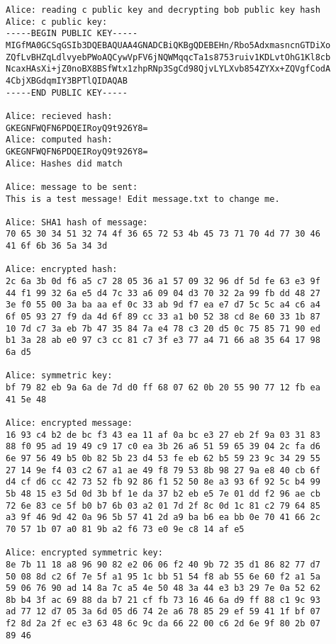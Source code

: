 \documentclass[letterpaper,12pt]{article} \usepackage{fullpage}
\begin{document}
\begin{itemize}
{\begin{verbatim}
Alice: reading c public key and decrypting bob public key hash
Alice: c public key: 
-----BEGIN PUBLIC KEY-----
MIGfMA0GCSqGSIb3DQEBAQUAA4GNADCBiQKBgQDEBEHn/Rbo5AdxmasncnGTDiXo
ZQfLvBHZqLdlvyebPWoAQCywVpFV6jNQWMqqcTa1s8753ruiv1KDLvtOhG1Kl8cb
NcaxHAsXi+jZ0noBX8BSfWtx1zhpRNp3SgCd98QjvLYLXvb854ZYXx+ZQVgfCodA
4CbjXBGdqmIY3BPTlQIDAQAB
-----END PUBLIC KEY-----

Alice: recieved hash: 
GKEGNFWQFN6PDQEIRoyQ9t926Y8=
Alice: computed hash: 
GKEGNFWQFN6PDQEIRoyQ9t926Y8=
Alice: Hashes did match

Alice: message to be sent: 
This is a test message! Edit message.txt to change me.

Alice: SHA1 hash of message: 
70 65 30 34 51 32 74 4f 36 65 72 53 4b 45 73 71 70 4d 77 30 46 
41 6f 6b 36 5a 34 3d

Alice: encrypted hash: 
2c 6a 3b 0d f6 a5 c7 28 05 36 a1 57 09 32 96 df 5d fe 63 e3 9f 
44 f1 99 32 6a e5 d4 7c 33 a6 09 04 d3 70 32 2a 99 fb dd 48 27 
3e f0 55 00 3a ba aa ef 0c 33 ab 9d f7 ea e7 d7 5c 5c a4 c6 a4 
6f 05 93 27 f9 da 4d 6f 89 cc 33 a1 b0 52 38 cd 8e 60 33 1b 87 
10 7d c7 3a eb 7b 47 35 84 7a e4 78 c3 20 d5 0c 75 85 71 90 ed 
b1 3a 28 ab e0 97 c3 cc 81 c7 3f e3 77 a4 71 66 a8 35 64 17 98 
6a d5

Alice: symmetric key: 
bf 79 82 eb 9a 6a de 7d d0 ff 68 07 62 0b 20 55 90 77 12 fb ea 
41 5e 48

Alice: encrypted message: 
16 93 c4 b2 de bc f3 43 ea 11 af 0a bc e3 27 eb 2f 9a 03 31 83 
88 f0 95 ad 19 49 c9 17 c0 ea 3b 26 a6 51 59 65 39 04 2c fa d6 
6e 97 56 49 b5 0b 82 5b 23 d4 53 fe eb 62 b5 59 23 9c 34 29 55 
27 14 9e f4 03 c2 67 a1 ae 49 f8 79 53 8b 98 27 9a e8 40 cb 6f 
d4 cf d6 cc 42 73 52 fb 92 86 f1 52 50 8e a3 93 6f 92 5c b4 99 
5b 48 15 e3 5d 0d 3b bf 1e da 37 b2 eb e5 7e 01 dd f2 96 ae cb 
72 6e 83 ce 5f b0 b7 6b 03 a2 01 7d 2f 8c 0d 1c 81 c2 79 64 85 
a3 9f 46 9d 42 0a 96 5b 57 41 2d a9 ba b6 ea bb 0e 70 41 66 2c 
70 57 1b 07 a0 81 9b a2 f6 73 e0 9e c8 14 af e5

Alice: encrypted symmetric key: 
8e 7b 11 18 a8 96 90 82 e2 06 06 f2 40 9b 72 35 d1 86 82 77 d7 
50 08 8d c2 6f 7e 5f a1 95 1c bb 51 54 f8 ab 55 6e 60 f2 a1 5a 
59 06 76 90 ad 14 8a 7c a5 4e 50 48 3a 44 e3 b3 29 7e 0a 52 62 
8b b4 3f ac 69 88 da b7 21 cf fb 73 16 46 6a d9 ff 88 c1 9c 93 
ad 77 12 d7 05 3a 6d 05 d6 74 2e a6 78 85 29 ef 59 41 1f bf 07 
f2 8d 2a 2f ec e3 63 48 6c 9c da 66 22 00 c6 2d 6e 9f 80 2b 07 
89 46


\end{verbatim}}
\end{itemize}
\end{document}
